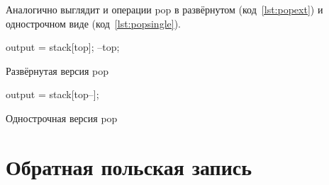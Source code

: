 \documentclass[12pt]{article}
\begin{document}
Аналогично выглядит и операции pop в развёрнутом (код~\ref{lst:popext}) и однострочном виде (код~\ref{lst:popsingle}).
\begin{listing}[H]
\begin{center}
\begin{ccode}
output = stack[top];
--top;
\end{ccode}
\end{center}
\caption{Развёрнутая версия pop}
\label{lst:popext}
\end{listing}
\begin{listing}[H]
\begin{center}
\begin{ccode}
output = stack[top--];
\end{ccode}
\end{center}
\caption{Однострочная версия pop}
\label{lst:popsingle}
\end{listing}

\section{Обратная польская запись}
\end{document}
